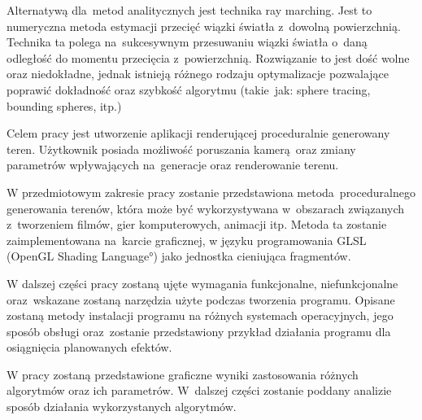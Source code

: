 Alternatywą dla~metod analitycznych jest technika ray marching. Jest to numeryczna metoda estymacji przecięć
wiązki światła z~dowolną powierzchnią\cite{bib:gpugems2}\cite{bib:spheretracing}.
Technika ta polega na~sukcesywnym przesuwaniu wiązki światła o~daną odległość do momentu przecięcia z~powierzchnią.
Rozwiązanie to jest dość wolne oraz niedokładne, jednak istnieją różnego rodzaju optymalizacje
pozwalające poprawić dokładność oraz szybkość algorytmu\cite{bib:Liktor2008RayTI} (takie~jak: sphere tracing, bounding spheres, itp.)

Celem pracy jest utworzenie aplikacji renderującej proceduralnie generowany teren. Użytkownik posiada możliwość poruszania kamerą oraz zmiany parametrów wpływających na~generacje oraz renderowanie terenu.

W przedmiotowym zakresie pracy zostanie przedstawiona metoda proceduralnego generowania
terenów, która może być wykorzystywana w~obszarach związanych z~tworzeniem filmów, gier komputerowych, animacji itp. Metoda ta zostanie zaimplementowana na~karcie graficznej, w języku programowania GLSL (\ang{OpenGL Shading Language}) jako jednostka cieniująca fragmentów.

W dalszej części pracy zostaną ujęte wymagania funkcjonalne, niefunkcjonalne oraz~wskazane zostaną narzędzia użyte podczas tworzenia programu.
Opisane zostaną metody instalacji programu na różnych systemach operacyjnych, jego sposób obsługi oraz~zostanie przedstawiony przykład działania programu dla osiągnięcia planowanych efektów.

W pracy zostaną przedstawione graficzne wyniki zastosowania różnych algorytmów oraz ich parametrów. W~dalszej części zostanie poddany analizie sposób działania wykorzystanych algorytmów.


